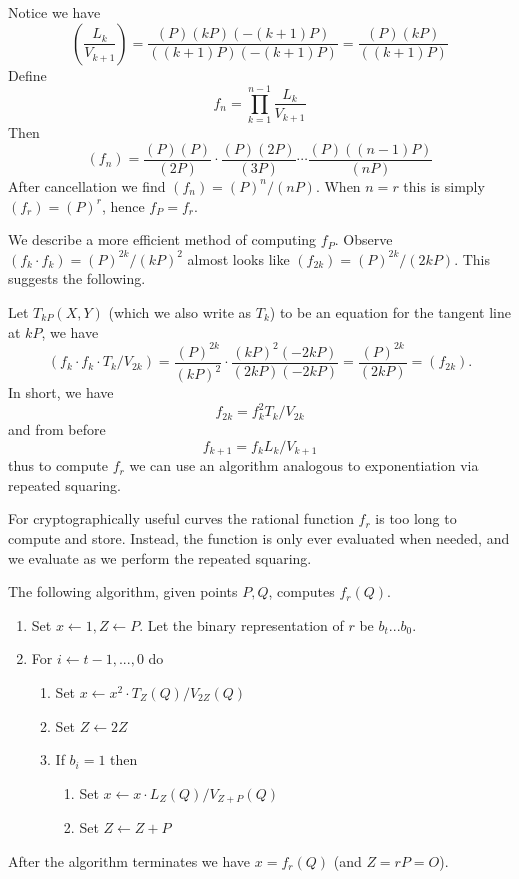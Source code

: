 Notice we have
\[
\left (
\frac{L_k}{V_{k+1}}
\right )
= \frac{(P)(kP)(-(k+1)P)}{((k+1)P)(-(k+1)P)}
= \frac{(P)(kP)}{((k+1)P)}
\]
Define
\[ f_n = \prod_{k=1}^{n-1} \frac{L_k}{V_{k+1}} \]
Then
\[ (f_n) =
\frac{(P)(P)}{(2P)}
\cdot
\frac{(P)(2P)}{(3P)}
\cdots
\frac{(P)((n-1)P)}{(nP)}
\]
After cancellation we find $(f_n) = (P)^n / (nP)$. When $n = r$ this
is simply $(f_r) = (P)^r$, hence $f_P = f_r$.

We describe a more efficient method of computing $f_P$.
Observe $(f_k \cdot f_k) = {(P)^{2k}}/{(kP)^2}$
almost looks like $(f_{2k}) = {(P)^{2k}}/{(2kP)}$.
This suggests the following.

Let $T_{kP}(X,Y)$ (which we also write as $T_k$)
to be an equation for the tangent line at $kP$,
we have
\[
(f_k \cdot f_k \cdot T_k / V_{2k} ) = \frac{(P)^{2k}}{(kP)^2} \cdot
\frac{(kP)^2 (-2kP)}{(2kP)(-2kP)} = \frac{(P)^{2k}}{(2kP)} = (f_{2k}) .
\]
In short, we have
\[
f_{2k} = f_k^2 T_k / V_{2k}
\]
and from before
\[
f_{k+1} = f_k L_{k} / V_{k+1}
\]
thus to compute $f_r$ we can use an algorithm analogous to exponentiation via
repeated squaring.

For cryptographically useful curves the rational function $f_r$
is too long to compute and store. Instead, the function is only ever
evaluated when needed, and we evaluate as we perform the repeated
squaring.

The following algorithm, given points $P, Q$, computes
$f_r(Q)$.

\begin{enumerate}
\item
Set $x \leftarrow 1, Z \leftarrow P$.
Let the binary representation of $r$ be $b_t ... b_0$.
\item
For $i \leftarrow t-1, ..., 0$ do
    \begin{enumerate}
    \item
    Set $x \leftarrow x^2 \cdot T_Z(Q) / V_{2Z}(Q)$
    \item
    Set $Z \leftarrow 2Z$
    \item
    If $b_i = 1$ then
	\begin{enumerate}
	\item
	Set $x \leftarrow x \cdot L_{Z}(Q) / V_{Z+P}(Q)$
	\item
	Set $Z \leftarrow Z + P$
	\end{enumerate}
    \end{enumerate}
\end{enumerate}

After the algorithm terminates we have $x = f_r(Q)$ (and $Z = rP = O$).

